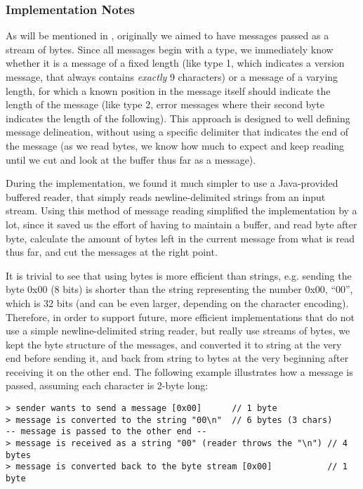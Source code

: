 \subsubsection{Implementation Notes}
\label{sec:pdus:pdu:impl}

As will be mentioned in , originally we aimed to have messages passed as a stream of bytes. Since all messages begin with a type, we immediately know whether it is a message of a fixed length (like type 1, which indicates a version message, that always contains {\em exactly} 9 characters) or a message of a varying length, for which a known position in the message itself should indicate the length of the message (like type 2, error messages where their second byte indicates the length of the following). This approach is designed to well defining message delineation, without using a specific delimiter that indicates the end of the message (as we read bytes, we know how much to expect and keep reading until we cut and look at the buffer thus far as a message).

During the implementation, we found it much simpler to use a Java-provided buffered reader, that simply reads newline-delimited strings from an input stream. Using this method of message reading simplified the implementation by a lot, since it saved us the effort of having to maintain a buffer, and read byte after byte, calculate the amount of bytes left in the current message from what is read thus far, and cut the messages at the right point.

It is trivial to see that using bytes is more efficient than strings, e.g. sending the byte 0x00 (8 bits) is shorter than the string representing the number 0x00, ``00'', which is 32 bits (and can be even larger, depending on the character encoding). Therefore, in order to support future, more efficient implementations that do not use a simple newline-delimited string reader, but really use streams of bytes, we kept the byte structure of the messages, and converted it to string at the very end before sending it, and back from string to bytes at the very beginning after receiving it on the other end. The following example illustrates how a message is passed, assuming each character is 2-byte long:

\begin{verbatim}
> sender wants to send a message [0x00]      // 1 byte
> message is converted to the string "00\n"  // 6 bytes (3 chars)
-- message is passed to the other end --
> message is received as a string "00" (reader throws the "\n") // 4 bytes
> message is converted back to the byte stream [0x00]           // 1 byte
\end{verbatim}

